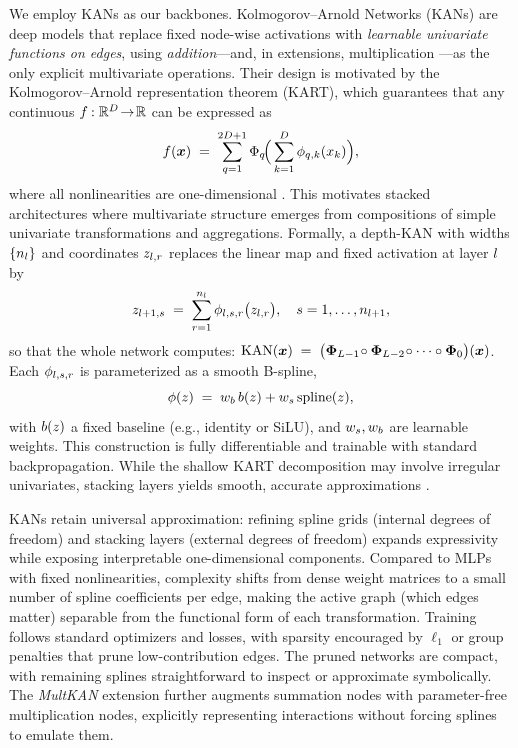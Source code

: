 We employ KANs as our backbones. Kolmogorov--Arnold Networks (KANs) \citep{liu2024kan} are deep models that replace fixed node-wise activations with \emph{learnable univariate functions on edges}, using \emph{addition}---and, in extensions, multiplication \citep{liu2024kan2}---as the only explicit multivariate operations. Their design is motivated by the Kolmogorov--Arnold representation theorem (KART), which guarantees that any continuous $f_{}:\mathbb{R}^{D}\!\to\!\mathbb{R}$ can be expressed as
\begin{equation}
\label{eq:ka}
f({\bm{x}}) \;=\; \sum_{q=1}^{2{D}+1} \Phi_q\!\Big(\sum_{k=1}^{{D}} \phi_{q,k}(x_k)\Big),
\end{equation}
where all nonlinearities are one-dimensional \citep{kolmogorov56,kolmogorov1957representations,braun2009constructive,Arnold1957}. This motivates stacked architectures where multivariate structure emerges from compositions of simple univariate transformations and aggregations.
Formally, a depth-\nLayers KAN with widths $\{n_l\}$ and coordinates $z_{l,r}$ replaces the linear map and fixed activation at layer $l$ by
\begin{equation}
\label{eq:kan-layer}
z_{l+1,s} \;=\; \sum_{r=1}^{n_l} \phi_{l,s,r}\big(z_{l,r}\big), \quad s=1,\dots,n_{l+1},
\end{equation}
so that the whole network computes: $
\text{KAN}({\bm{x}}) \;=\; \big(\boldsymbol\Phi_{L-1}\!\circ\boldsymbol\Phi_{L-2}\!\circ\cdots\circ\boldsymbol\Phi_{0}\big)({\bm{x}})$.
Each $\phi_{l,s,r}$ is parameterized as a smooth B-spline,
\[
\phi(z) \;=\; w_b\,b(z) + w_s\,\text{spline}(z),
\]
with $b(z)$ a fixed baseline (e.g., identity or SiLU), and $w_s, w_b$ are learnable weights. This construction is fully differentiable and trainable with standard backpropagation. While the shallow KART decomposition may involve irregular univariates, stacking layers yields smooth, accurate approximations \citep{liu2024kan}.

KANs retain universal approximation: refining spline grids (internal degrees of freedom) and stacking layers (external degrees of freedom) expands expressivity while exposing interpretable one-dimensional components. Compared to MLPs with fixed nonlinearities, complexity shifts from dense weight matrices to a small number of spline coefficients per edge, making the active graph (which edges matter) separable from the functional form of each transformation. Training follows standard optimizers and losses, with sparsity encouraged by $\ell_1$ or group penalties that prune low-contribution edges. The pruned networks are compact, with remaining splines straightforward to inspect or approximate symbolically. The \emph{MultKAN} extension \citep{liu2024kan2} further augments summation nodes with parameter-free multiplication nodes, explicitly representing interactions without forcing splines to emulate them.

